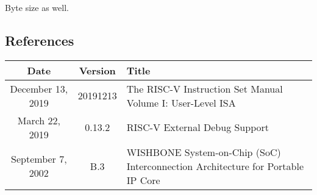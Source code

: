 Byte size as well.

\subsection{References}

\begin{center}
{
  \vspace{0.5em}
  \small
  \begin{tabularx}{0.9\textwidth}{|c|c|X|}
    \hline
    \cellcolor{gray!20}\textbf{Date} & \cellcolor{gray!20}\textbf{Version} & \cellcolor{gray!20}\textbf{Title} \\
    \hline
    December 13, 2019 & 20191213 & The RISC-V Instruction Set Manual Volume I: User-Level ISA \\
    \hline
    March 22, 2019 & 0.13.2 & RISC-V External Debug Support \\
    \hline
    September 7, 2002 & B.3 & WISHBONE System-on-Chip (SoC) Interconnection Architecture for Portable IP Core \\
    \hline
  \end{tabularx}
  \vspace{0.5em}
}
\end{center}

\newpage
